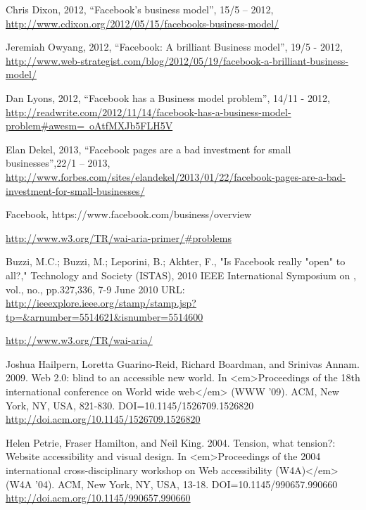 \documentclass[conference]{IEEEtran}
\begin{document}
\begin{thebibliography}{1}
{
Chris Dixon, 2012, “Facebook's business model”, 15/5 – 2012,
\href{http://www.cdixon.org/2012/05/15/facebooks-business-model/}{http://www.cdixon.org/2012/05/15/facebooks-business-model/}

Jeremiah Owyang, 2012, “Facebook: A brilliant Business model”, 19/5 - 2012,
\href{http://www.web-strategist.com/blog/2012/05/19/facebook-a-brilliant-business-model/}{http://www.web-strategist.com/blog/2012/05/19/facebook-a-brilliant-business-model/}

Dan Lyons, 2012, “Facebook has a Business model problem”, 14/11 - 2012,
\href{http://readwrite.com/2012/11/14/facebook-has-a-business-model-problem#awesm=~oAtfMXJb5FLH5V}{http://readwrite.com/2012/11/14/facebook-has-a-business-model-problem#awesm=~oAtfMXJb5FLH5V}

Elan Dekel, 2013, “Facebook pages are a bad investment for small
businesses”,22/1 – 2013,
\href{http://www.forbes.com/sites/elandekel/2013/01/22/facebook-pages-are-a-bad-investment-for-small-businesses/}{http://www.forbes.com/sites/elandekel/2013/01/22/facebook-pages-are-a-bad-investment-for-small-businesses/}

Facebook, https://www.facebook.com/business/overview

    \href{http://www.w3.org/TR/wai-aria-primer/#problems}{http://www.w3.org/TR/wai-aria-primer/#problems }

Buzzi, M.C.; Buzzi, M.; Leporini, B.; Akhter, F., "Is Facebook really "open" to
all?," Technology and Society (ISTAS), 2010 IEEE International Symposium on ,
vol., no., pp.327,336, 7-9 June 2010
URL: \href{http://ieeexplore.ieee.org/stamp/stamp.jsp?tp=&arnumber=5514621&isnumber=5514600}{http://ieeexplore.ieee.org/stamp/stamp.jsp?tp=&arnumber=5514621&isnumber=5514600}

    \href{http://www.w3.org/TR/wai-aria/}{http://www.w3.org/TR/wai-aria/ }

Joshua Hailpern, Loretta Guarino-Reid, Richard Boardman, and Srinivas Annam.
2009. Web 2.0: blind to an accessible new world.  In <em>Proceedings of the
18th international conference on World wide web</em> (WWW '09). ACM, New York,
NY, USA,  821-830. DOI=10.1145/1526709.1526820
\href{http://doi.acm.org/10.1145/1526709.1526820}{http://doi.acm.org/10.1145/1526709.1526820}

Helen Petrie, Fraser Hamilton, and Neil King. 2004. Tension, what tension?:
Website accessibility and visual design.  In <em>Proceedings of the 2004
international cross-disciplinary workshop on Web accessibility (W4A)</em> (W4A
'04). ACM, New York, NY, USA,  13-18. DOI=10.1145/990657.990660
\href{http://doi.acm.org/10.1145/990657.990660}{http://doi.acm.org/10.1145/990657.990660}

}
\end{thebibliography}
\end{document}
